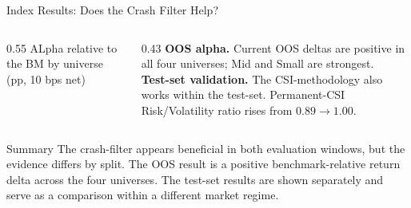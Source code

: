 \documentclass[10pt]{beamer}\usepackage[]{graphicx}\usepackage[table]{xcolor}
\begin{document}
\begin{frame}{Index Results: Does the Crash Filter Help?}
\small

\vspace{0.3em}

\begin{columns}[T]
\begin{column}{0.55\textwidth}
\centering
{\scriptsize ALpha relative to the BM by universe (pp, 10 bps net)}\\[3pt]
\\[2pt]
\end{column}
\begin{column}{0.43\textwidth}
\scriptsize
\textbf{\color{MainColour}OOS alpha.} Current OOS deltas are positive in all four universes; Mid and Small are strongest.\\[5pt]
\textbf{\color{MainColour}Test-set validation.} The CSI-methodology also works within the test-set. Permanent-CSI Risk/Volatility ratio rises from $0.89 \to \mathbf{1.00}$.\\[5pt]
\end{column}
\end{columns}

\begin{alertblock}{Summary}
\scriptsize
The crash-filter appears beneficial in both evaluation windows, but the evidence differs by split. The OOS result is a positive benchmark-relative return delta across the four universes. The test-set results are shown separately and serve as a comparison within a different market regime.
\end{alertblock}

\end{frame}
\end{document}

